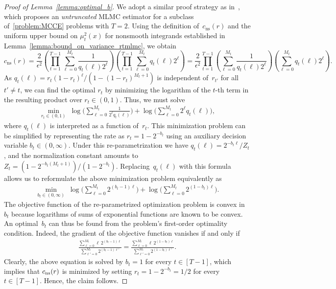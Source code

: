 \documentclass[11pt]{article}
\begin{document}
\begin{proof}[Proof of Lemma~\ref{lemma:optimal_b}] 
We adopt a similar proof strategy as in~\cite[\S~3]{blanchet2015unbiased}, which proposes an {\em untruncated} MLMC estimator for a subclass of~\eqref{problem:MCCE} problems with $T = 2$. Using the definition of~$c_{\mathrm{ns}}(r)$ and the uniform upper bound on $\mu_t^2(x)$ for nonsmooth integrands established in Lemma~\ref{lemma:bound_on_variance_rtmlmc}, we obtain
\[
    c_{\mathrm{ns}}(r) = \frac{2}{\epsilon^2} \left(\prod_{t=1}^{T-1} \sum_{\ell=0}^{M_t} \frac{1}{q_t(\ell)2^{\ell}} \right) \left(\prod_{t=1}^{T-1} \sum_{\ell=0}^{M_t} q_t(\ell)2^{\ell}\right) = \frac{2}{\epsilon^2} \prod_{t=1}^{T-1} \left(\sum_{\ell=0}^{M_t} \frac{1}{q_t(\ell)2^{\ell}} \right) \left( \sum_{\ell=0}^{M_t} q_t(\ell)2^{\ell}\right).
\]
As $q_t(\ell) = r_t(1-r_t)^\ell/(1-(1-r_t)^{M_t+1})$ is independent of~$r_{t'}$ for all $t'\neq t$, we can find the optimal $r_t$ by minimizing the logarithm of the $t$-th term in the resulting product over $r_t\in(0,1)$. Thus, we must solve
\begin{align*}
    \min_{r_t\in(0,1) }\; \log\bigg(\sum_{\ell=0}^{M_t}\frac{1}{2^{\ell}q_t(\ell)} \bigg) +\log\bigg(\sum_{\ell=0}^{M_t}2^{\ell}q_t(\ell)  \bigg),
\end{align*}
where $q_t(\ell)$ is interpreted as a function of~$r_t$.  This minimization problem can be simplified by representing the rate as $r_t=1-2^{-b_t}$ using an auxiliary decision variable $b_t\in (0,\infty)$. Under this re-parametrization we have $q_t(\ell)=2^{-b_t\ell}/Z_t$, and the normalization constant amounts to $Z_t=(1-2^{-b_t(M_t+1)}) / (1-2^{-b_t})$. Replacing~$q_t(\ell)$ with this formula allows us to reformulate the above minimization problem equivalently as
\begin{align*}
    \min_{b_t \in (0,\infty)}\; \log\bigg(\sum_{\ell=0}^{M_t}2^{(b_t-1)\ell} \bigg) +\log\bigg(\sum_{\ell=0}^{M_t}2^{(1-b_t)\ell}  \bigg).
\end{align*}
The objective function of the re-parametrized optimization problem is convex in~$b_t$ because logarithms of sums of exponential functions are known to be convex. An optimal~$b_t$ can thus be found from the problem's first-order optimality condition. Indeed, the gradient of the objective function vanishes if and only if
\begin{align*}
    \frac{\sum_{\ell=0}^{M_t} \ell\,2^{(b_t-1)\ell}}{\sum_{\ell'=0}^{M_t} 2^{(b_t-1)\ell'}}= \frac{\sum_{\ell=0}^{M_t} \ell\,2^{(1-b_t)\ell}}{\sum_{\ell'=0}^{M_t} 2^{(1-b_t)\ell'}}.
\end{align*}
Clearly, the above equation is solved by $b_t=1$ for every $t\in[T-1]$, which implies that $c_{\rm ns}(r)$ is minimized by setting $r_t=1-2^{-b_t}=1/2$ for every $t\in[T-1]$. Hence, the claim follows.
\end{proof}
\end{document}
